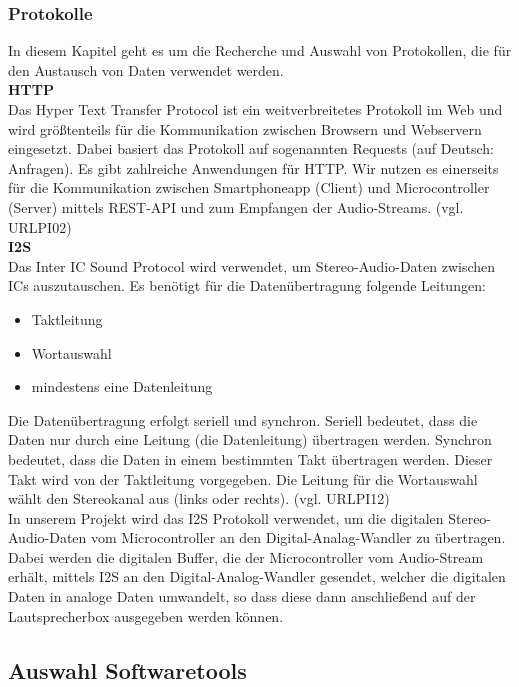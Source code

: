 \documentclass[]{article}
\begin{document}
\subsubsection{Protokolle}
In diesem Kapitel geht es um die Recherche und Auswahl von Protokollen, die für den Austausch von Daten verwendet werden.
\newline \\
\textbf{HTTP} \\
Das Hyper Text Transfer Protocol ist ein weitverbreitetes Protokoll im Web und wird größtenteils für die Kommunikation zwischen Browsern und Webservern eingesetzt. Dabei basiert das Protokoll auf sogenannten \glqq Requests\grqq{} (auf Deutsch: Anfragen). Es gibt zahlreiche Anwendungen für HTTP. Wir nutzen es einerseits für die Kommunikation zwischen Smartphoneapp (Client) und Microcontroller (Server) mittels REST-API und zum Empfangen der Audio-Streams. (vgl. URLPI02) \newline \\
\textbf{I2S}\\
Das Inter IC Sound Protocol wird verwendet, um Stereo-Audio-Daten zwischen ICs auszutauschen. Es benötigt für die Datenübertragung folgende Leitungen:
\begin{itemize}
\item Taktleitung
\item Wortauswahl
\item mindestens eine Datenleitung
\end{itemize}
Die Datenübertragung erfolgt seriell und synchron. Seriell bedeutet, dass die Daten nur durch eine Leitung (die Datenleitung) übertragen werden. Synchron bedeutet, dass die Daten in einem bestimmten Takt übertragen werden. Dieser Takt wird von der Taktleitung vorgegeben. Die Leitung für die Wortauswahl wählt den Stereokanal aus (links oder rechts). (vgl. URLPI12) \\
In unserem Projekt wird das I2S Protokoll verwendet, um die digitalen Stereo-Audio-Daten vom Microcontroller an den Digital-Analag-Wandler zu übertragen.
Dabei werden die digitalen Buffer, die der Microcontroller vom Audio-Stream erhält, mittels I2S an den Digital-Analog-Wandler gesendet, welcher die digitalen Daten in analoge Daten umwandelt, so dass diese dann anschließend auf der Lautsprecherbox ausgegeben werden können.
\subsection{Auswahl Softwaretools}
\end{document}
